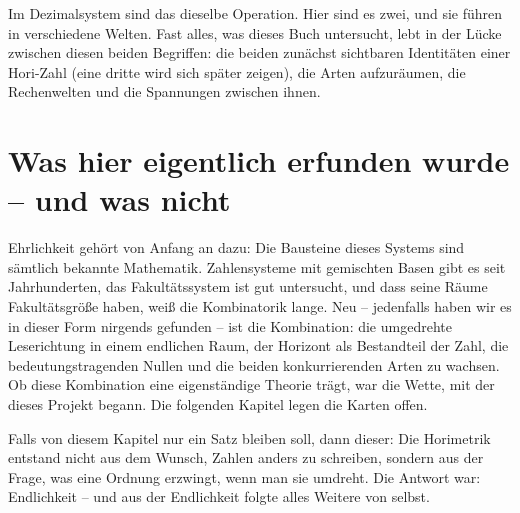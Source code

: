 Im Dezimalsystem sind das dieselbe Operation. Hier sind es zwei, und
sie führen in verschiedene Welten. Fast alles, was dieses Buch
untersucht, lebt in der Lücke zwischen diesen beiden Begriffen: die
beiden zunächst sichtbaren Identitäten einer Hori-Zahl (eine dritte
wird sich später zeigen), die Arten aufzuräumen, die Rechenwelten
und die Spannungen zwischen ihnen.

\section{Was hier eigentlich erfunden wurde -- und was nicht}

Ehrlichkeit gehört von Anfang an dazu: Die Bausteine dieses Systems
sind sämtlich bekannte Mathematik. Zahlensysteme mit gemischten Basen
gibt es seit Jahrhunderten, das Fakultätssystem ist gut untersucht,
und dass seine Räume Fakultätsgröße haben, weiß die Kombinatorik
lange. Neu -- jedenfalls haben wir es in dieser Form nirgends gefunden
-- ist die Kombination: die umgedrehte Leserichtung in einem endlichen
Raum, der Horizont als Bestandteil der Zahl, die bedeutungstragenden
Nullen und die beiden konkurrierenden Arten zu wachsen. Ob diese
Kombination eine eigenständige Theorie trägt, war die Wette, mit der
dieses Projekt begann. Die folgenden Kapitel legen die Karten offen.

\begin{oberflaeche}
Falls von diesem Kapitel nur ein Satz bleiben soll, dann dieser: Die
Horimetrik entstand nicht aus dem Wunsch, Zahlen anders zu schreiben,
sondern aus der Frage, was eine Ordnung erzwingt, wenn man sie
umdreht. Die Antwort war: Endlichkeit -- und aus der Endlichkeit
folgte alles Weitere von selbst.
\end{oberflaeche}
